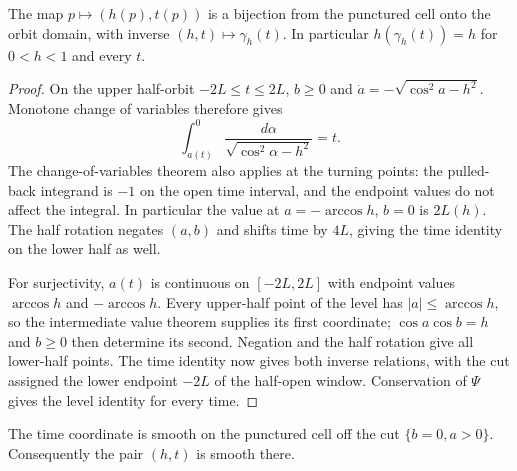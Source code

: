 \begin{lemma}
\label{lem:orbit-coordinates-inverse}
\leanok
The map $p\mapsto(h(p),t(p))$ is a bijection from the punctured cell
onto the orbit domain, with inverse $(h,t)\mapsto\gamma_h(t)$.
In particular $h(\gamma_h(t))=h$ for $0<h<1$ and every $t$.
\end{lemma}

\begin{proof}
\leanok
On the upper half-orbit $-2L\le t\le2L$, $b\ge0$ and
$\dot a=-\sqrt{\cos^2a-h^2}$. Monotone change of variables therefore gives
\[
  \int_{a(t)}^0\frac{d\alpha}{\sqrt{\cos^2\alpha-h^2}}=t.
\]
The change-of-variables theorem also applies at the turning points:
the pulled-back integrand is $-1$ on the open time interval, and the
endpoint values do not affect the integral. In particular the value at
$a=-\arccos h$, $b=0$ is $2L(h)$. The half rotation negates $(a,b)$ and
shifts time by $4L$, giving the time identity on the lower half as well.

For surjectivity, $a(t)$ is continuous on $[-2L,2L]$ with endpoint values
$\arccos h$ and $-\arccos h$. Every upper-half point of the level has
$|a|\le\arccos h$, so the intermediate value theorem supplies its first
coordinate; $\cos a\cos b=h$ and $b\ge0$ then determine its second.
Negation and the half rotation give all lower-half points. The time
identity now gives both inverse relations, with the cut assigned the
lower endpoint $-2L$ of the half-open window. Conservation of $\Psi$
gives the level identity for every time.
\end{proof}

\begin{lemma}
\label{lem:orbit-coordinates-smooth}
\leanok
The time coordinate is smooth on the punctured cell off the cut
$\{b=0,a>0\}$. Consequently the pair $(h,t)$ is smooth there.
\end{lemma}

